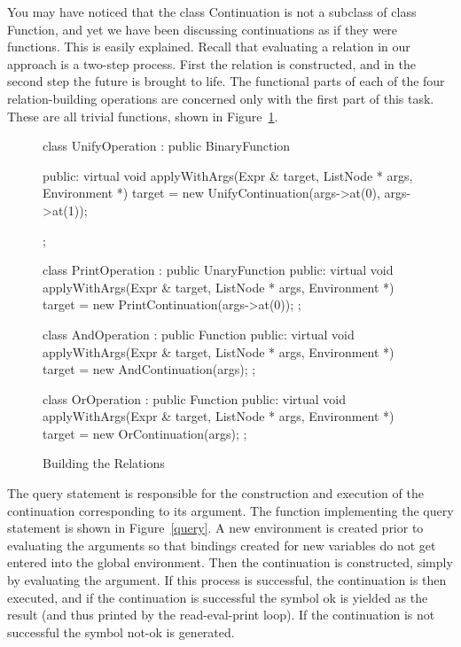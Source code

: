 You may have noticed that the class {\sf Continuation} is not a subclass of
class {\sf Function}, and yet we have been discussing continuations as if
they were functions.  This is easily explained.  Recall that evaluating a
relation in our approach is a two-step process.  First the relation is
constructed, and in the second step the future is brought to life.
The functional parts of each of the four relation-building operations
are concerned only with the first part of this task.   These are all
trivial functions, shown in Figure~\ref{relbuild}.

\begin{figure}
\begin{cprog}
class UnifyOperation : public BinaryFunction {
public:
	virtual void applyWithArgs(Expr & target, ListNode * args, 
		Environment *)
		{ target = new UnifyContinuation(args->at(0), args->at(1)); }

};

class PrintOperation : public UnaryFunction {
public:
	virtual void applyWithArgs(Expr & target, ListNode * args, 
		Environment *)
		{ target = new PrintContinuation(args->at(0)); }
};

class AndOperation : public Function {
public:
	virtual void applyWithArgs(Expr & target, ListNode * args, 
		Environment *)
		{ target = new AndContinuation(args); }
};

class OrOperation : public Function {
public:
	virtual void applyWithArgs(Expr & target, ListNode * args, 
		Environment *)
		{ target = new OrContinuation(args); }
};
\end{cprog}
\caption{Building the Relations}\label{relbuild}
\end{figure}

The {\sf query} statement is responsible for the construction and execution
of the continuation corresponding to its argument.  The function
implementing the {\sf query} statement is shown in Figure~\ref{query}.
A new environment is created prior to evaluating the arguments so that
bindings created for new variables do not get entered into the global
environment.  Then the continuation is constructed, simply by evaluating
the argument.  If this process is successful, the continuation is then
executed, and if the continuation is successful the symbol {\sf ok} is
yielded as the result (and thus printed by the read-eval-print loop).
If the continuation is not successful the symbol {\sf not-ok} is generated.

